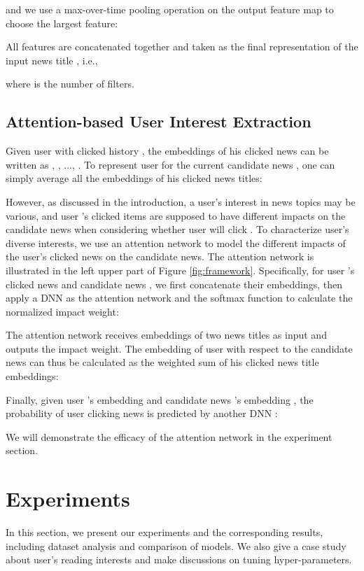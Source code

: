 \documentclass[sigconf]{acmart}
\begin{document}
		and we use a max-over-time pooling operation on the output feature map to choose the largest feature:
		
		All features  are concatenated together and taken as the final representation  of the input news title , i.e.,
		
		where  is the number of filters.
		
		
	\subsection{Attention-based User Interest Extraction}
	\label{sec:auie}
		Given user  with clicked history , the embeddings of his clicked news can be written as , , ..., .
		To represent user  for the current candidate news , one can simply average all the embeddings of his clicked news titles:
		
		However, as discussed in the introduction, a user's interest in news topics may be various, and user 's clicked items are supposed to have different impacts on the candidate news  when considering whether user  will click .
		To characterize user's diverse interests, we use an attention network \cite{wang2017dynamic, zhou2017deep} to model the different impacts of the user's clicked news on the candidate news.
		The attention network is illustrated in the left upper part of Figure \ref{fig:framework}.
		Specifically, for user 's clicked news  and candidate news , we first concatenate their embeddings, then apply a DNN  as the attention network and the softmax function to calculate the normalized impact weight: 
		
		The attention network  receives embeddings of two news titles as input and outputs the impact weight.
		The embedding of user  with respect to the candidate news  can thus be calculated as the weighted sum of his clicked news title embeddings:
		
		
		Finally, given user 's embedding  and candidate news 's embedding , the probability of user  clicking news  is predicted by another DNN :
		
		
		We will demonstrate the efficacy of the attention network in the experiment section.
		

\section{Experiments}
	In this section, we present our experiments and the corresponding results, including dataset analysis and comparison of models.
	We also give a case study about user's reading interests and make discussions on tuning hyper-parameters.
	
\end{document}
